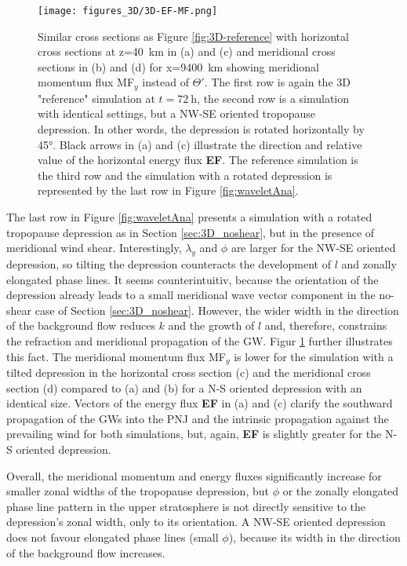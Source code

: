 \begin{figure}[t]
    \centering
    \texttt{[image: figures\_3D/3D-EF-MF.png]}
    \caption{Similar cross sections as Figure \ref{fig:3D-reference} with horizontal cross sections at z=\SI{40}{\kilo\meter} in (a) and (c) and meridional cross sections in (b) and (d) for x=\SI{9400}{\kilo\meter} showing meridional momentum flux MF$_y$ instead of $\Theta'$. The first row is again the 3D "reference" simulation at $t=\SI{72}{\hour}$, the second row is a simulation with identical settings, but a NW-SE oriented tropopause depression. In other words, the depression is rotated horizontally by 45°. Black arrows in (a) and (c) illustrate the direction and relative value of the horizontal energy flux \textbf{EF}. The reference simulation is the third row and the simulation with a rotated depression is represented by the last row in Figure \ref{fig:waveletAna}.}
    \label{fig:3D-MFy}
\end{figure}
The last row in Figure \ref{fig:waveletAna} presents a simulation with a rotated tropopause depression as in Section \ref{sec:3D_noshear}, but in the presence of meridional wind shear. Interestingly, $\lambda_y$ and $\phi$ are larger for the NW-SE oriented depression, so tilting the depression counteracts the development of $l$ and zonally elongated phase lines. It seems counterintuitiv, because the orientation of the depression already leads to a small meridional wave vector component in the no-shear case of Section \ref{sec:3D_noshear}. However, the wider width in the direction of the background flow reduces $k$ and the growth of $l$ and, therefore, constrains the refraction and meridional propagation of the GW. Figur \ref{fig:3D-MFy} further illustrates this fact. The meridional momentum flux MF$_y$ is lower for the simulation with a tilted depression in the horizontal cross section (c) and the meridional cross section (d) compared to (a) and (b) for a N-S oriented depression with an identical size. Vectors of the energy flux \textbf{EF} in (a) and (c) clarify the southward propagation of the GWs into the PNJ and the intrinsic propagation against the prevailing wind for both simulations, but, again, \textbf{EF} is slightly greater for the N-S oriented depression.

Overall, the meridional momentum and energy fluxes significantly increase for smaller zonal widths of the tropopause depression, but $\phi$ or the zonally elongated phase line pattern in the upper stratosphere is not directly sensitive to the depression's zonal width, only to its orientation. A NW-SE oriented depression does not favour elongated phase lines (small $\phi$), because its width in the direction of the background flow increases.

